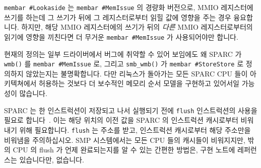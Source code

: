 {\tt membar \#Lookaside} 는 {\tt membar \#MemIssue} 의 경량화 버전으로, MMIO
레지스터에 쓰기를 하는데 그 쓰기가 뒤에 그 레지스터로부터 읽힐 값에 영향을 주는
경우 융요합니다.
하지만, 해당 MMIO 레지스터에의 쓰기가 뒤의 {\em 다른} MMIO 레지스터로부터의
읽기에 영향을 끼친다면 더 무거운 {\tt membar \#MemIssue} 가 사용되어야만
합니다.

현재의 정의는 일부 드라이버에서 버그에 취약할 수 있어 보임에도 왜 SPARC 가 {\tt
wmb()} 를 {\tt membar \#MemIssue} 로, 그리고 {\tt smb\_wmb()} 가 {\tt membar
\#StoreStore} 로 정의하지 않았는지는 불명확합니다.
다만 리눅스가 돌아가는 모든 SPARC CPU 들이 아키텍쳐에서 허용하는 것보다 더
보수적인 메모리 순서 모델을 구현하고 있어서일 가능성이 많습니다.

SPARC 는 한 인스트럭션이 저장되고 나서 실행되기 전에 {\tt flush} 인스트럭션의
사용을 필요로 합니다~\cite{SPARC94}.
이는 해당 위치의 이전 값을 SPARC 의 인스트럭션 캐시로부터 비워내기 위해
필요합니다.
{\tt flush} 는 주소를 받고, 인스트럭션 캐시로부터 해당 주소만을 비워냄을
주의하십시오.
SMP 시스템에서는 모든 CPU 들의 캐시들이 비워지지만, 밖의 CPU 의 flush 가 언제
완료되는지를 알 수 있는 간편한 방법은, 구현 노트에 레퍼런스는 있습니다만,
없습니다.

